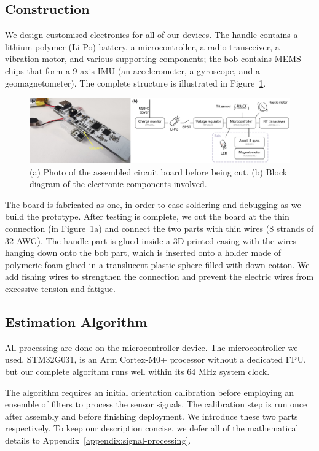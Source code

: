 \documentclass{nime-alternate} %
\begin{document}
\subsection{Construction}
We design customised electronics for all of our devices. The handle contains a lithium polymer (Li-Po) battery, a microcontroller, a radio transceiver, a vibration motor, and various supporting components; the bob contains MEMS chips that form a 9-axis IMU (an accelerometer, a gyroscope, and a geomagnetometer). The complete structure is illustrated in Figure~\ref{fig:WandConstruction}.

\begin{figure}[t!]
  \centering
  \includegraphics[width=1\textwidth]{Mw_Wand.pdf}
  \caption{(a) Photo of the assembled circuit board before being cut. (b) Block diagram of the electronic components involved.}
  \label{fig:WandConstruction}
\end{figure}

The board is fabricated as one, in order to ease soldering and debugging as we build the prototype. After testing is complete, we cut the board at the thin connection (in Figure~\ref{fig:WandConstruction}a) and connect the two parts with thin wires (8 strands of 32 AWG). The handle part is glued inside a 3D-printed casing with the wires hanging down onto the bob part, which is inserted onto a holder made of polymeric foam glued in a translucent plastic sphere filled with down cotton. We add fishing wires to strengthen the connection and prevent the electric wires from excessive tension and fatigue.

\subsection{Estimation Algorithm}
All processing are done on the microcontroller device. The microcontroller we used, STM32G031, is an Arm Cortex-M0+ processor without a dedicated FPU, but our complete algorithm runs well within its 64 MHz system clock.

The algorithm requires an initial orientation calibration before employing an ensemble of filters to process the sensor signals. The calibration step is run once after assembly and before finishing deployment. We introduce these two parts respectively. To keep our description concise, we defer all of the mathematical details to Appendix~\ref{appendix:signal-processing}.
\end{document}

